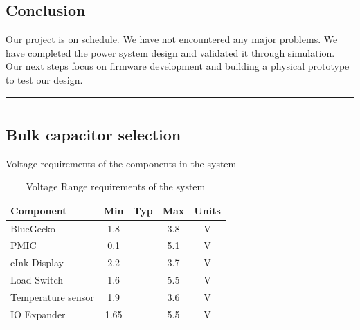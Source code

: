 \documentclass[a4paper,11pt]{article}%
\begin{document}
\subsection{Conclusion}

Our project is on schedule. We have not encountered any major problems. We have completed the power system design and validated it through simulation. Our next steps focus on firmware development and building a physical prototype to test our design.





\pagebreak

\hrule

\section{\color{red}{Update 5}}

\subsection{Bulk capacitor selection}

Voltage requirements of the components in the system
\begin{table}[h!]
    \centering
    \begin{tabular}{|l|c|c|c|c|}
    \hline
    \textbf{Component}        & \textbf{Min} & \textbf{Typ} & \textbf{Max} & \textbf{Units} \\ \hline
    BlueGecko                 & 1.8          &              & 3.8          & V             \\ \hline
    PMIC                      & 0.1          &              & 5.1          & V             \\ \hline
    eInk Display              & 2.2          &              & 3.7          & V             \\ \hline
    Load Switch               & 1.6          &              & 5.5          & V             \\ \hline
    Temperature sensor        & 1.9          &              & 3.6          & V             \\ \hline
    IO Expander               & 1.65         &              & 5.5          & V             \\ \hline
    \end{tabular}
    \caption{Voltage Range requirements of the system}
    \end{table}
    
\end{document}
